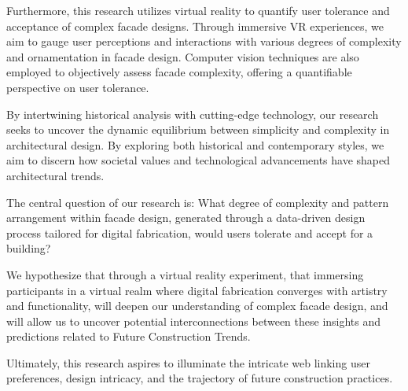 Furthermore, this research utilizes virtual reality to quantify user tolerance and acceptance of complex facade designs.
Through immersive VR experiences, we aim to gauge user perceptions and interactions with various degrees of complexity and ornamentation in facade design.
Computer vision techniques are also employed to objectively assess facade complexity, offering a quantifiable perspective on user tolerance.

By intertwining historical analysis with cutting-edge technology, our research seeks to uncover the dynamic equilibrium between simplicity and complexity in architectural design.
By exploring both historical and contemporary styles, we aim to discern how societal values and technological advancements have shaped architectural trends.

The central question of our research is: What degree of complexity and pattern arrangement within facade design, generated through a data-driven design process tailored for digital fabrication, would users tolerate and accept for a building?

We hypothesize that through a virtual reality experiment, that immersing participants in a virtual realm where digital fabrication converges with artistry and functionality, will deepen our understanding of complex facade design, and will allow us to uncover potential interconnections between these insights and predictions related to Future Construction Trends.

Ultimately, this research aspires to illuminate the intricate web linking user preferences, design intricacy, and the trajectory of future construction practices.






